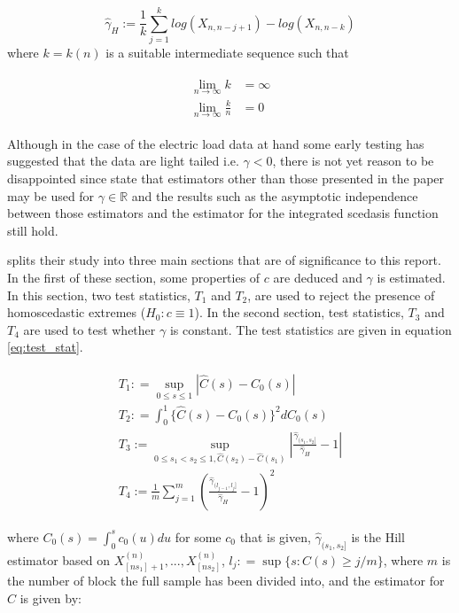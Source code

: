 \documentclass[a4paper]{article}
\begin{document}
\begin{equation} \label{eq:hill_est}
\hat{\gamma}_H := \frac{1}{k} \sum_{j=1}^k log(X_{n,n-j+1}) - log(X_{n,n-k})
\end{equation}
where $k=k(n)$ is a suitable intermediate sequence such that 

\begin{align} \label{eq:k_cond}
\begin{split}
\lim_{n \rightarrow \infty} k &= \infty \\
\lim_{n \rightarrow \infty} \frac{k}{n} &= 0
\end{split}
\end{align}

Although in the case of the electric load data at hand some early testing has suggested that the data are light tailed i.e. $\gamma < 0 $, there is not yet reason to be disappointed since \cite{einmahl16} state that estimators other than those presented in the paper may be used for $\gamma \in \mathbb{R}$ and the results such as the asymptotic independence between those estimators and the estimator for the integrated scedasis function still hold.

\cite{einmahl16} splits their study into three main sections that are of significance to this report. In the first of these section, some properties of $c$ are deduced and $\gamma$ is estimated. In this section, two test statistics, $T_1$ and $T_2$, are used to reject the presence of homoscedastic extremes ($H_0: c \equiv 1$). In the second section, test statistics, $T_3$ and $T_4$ are used to test whether $\gamma$ is constant. The test statistics are given in equation \ref{eq:test_stat}.

\begin{align} \label{eq:test_stat}
\begin{split}
T_1 : = \sup_{0 \le s \le 1} |\hat{C}(s) - C_0(s)|\\
T_2 : = \int_0^1 \{\hat{C}(s) - C_0(s)\}^2 dC_0(s)\\
T_3 := \sup_{0 \le s_1 < s_2 \le 1, \hat{C}(s_2) - \hat{C}(s_1)}|\frac{\hat{\gamma}_{(s_1,s_2]}}{\hat{\gamma}_H} -1| \\
T_4 := \frac{1}{m} \sum_{j=1}^m (\frac{\hat{\gamma}_{(l_{j-1},l_j]}}{\hat{\gamma}_H}-1)^2
\end{split}
\end{align}

\noindent where $C_0(s) = \int_0^s c_0(u)du$ for some $c_0$ that is given, $\hat{\gamma}_{(s_1,s_2]}$ is the Hill estimator based on $X_{[ns_1]+1}^{(n)}, ... , X_{[ns_2]}^{(n)}$,  $l_j : = \sup\{s: \hat{C}(s) \ge j/m\}$, where $m$ is the number of block the full sample has been divided into, and the estimator for $C$ is given by:
\end{document}
